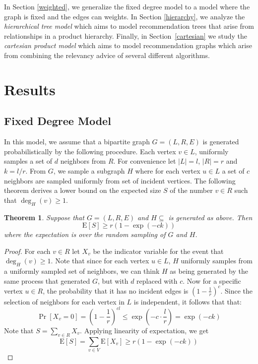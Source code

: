\documentclass[]{article}
\newcommand{\E}{\text{E}}
\newtheorem{thm}{Theorem}
\begin{document}
In Section \ref{weighted}, we generalize the fixed degree model to a
model where the graph is fixed and the edges can weights. In Section
\ref{hierarchy}, we analyze the {\em hierarchical tree model} which
aims to model recommendation trees that arise from relationships in a
product hierarchy. Finally, in Section~\ref{cartesian} we study the 
{\em cartesian product model} which aims to model recommendation 
graphs which arise from combining the relevancy advice of several 
different algorithms.

\section{Results}
\subsection{Fixed Degree Model}
\label{fixed-degree}

In this model, we assume that a bipartite graph $G=(L,R,E)$ is
generated probabilistically by the following procedure. Each
vertex $v\in L$, uniformly samples a set of $d$ neighbors
from $R$. For convenience let $|L|=l$, $|R|=r$ and $k=l/r$. From
$G$, we sample a subgraph $H$ where for each vertex $u\in L$ a set of
$c$ neighbors are sampled uniformly from set of incident vertices. The
following theorem derives a lower bound on the expected size $S$ of the
number $v\in R$ such that $\deg_H(v) \geq 1$.

\begin{thm}
Suppose that $G=(L,R,E)$ and $H\subseteq$ is generated as above. Then
\[ \E[S] \geq r(1-\exp(-ck))\]
where the expectation is over the random sampling of $G$ and $H$.
\end{thm}
\begin{proof}
For each $v\in R$ let $X_v$ be the indicator variable for the event
that $\deg_H(v) \geq 1$. Note that since for each vertex $u\in L$, $H$
uniformly samples from a uniformly sampled set of neighbors, we can
think $H$ as being generated by the same process that generated $G$,
but with $d$ replaced with $c$. Now for a specific vertex $u \in R$,
the probability that it has no incident edges is 
$\left(1-\frac{1}{r}\right)^c$. Since the selection of neighbors for each 
vertex in $L$ is independent, it follows that that:
\[ \Pr[X_v=0] = \left(1-\frac{1}{r}\right)^{cl} \leq \exp\left(-c \cdot \frac{l}{r}\right) = \exp(-ck) \]
Note that $S = \sum_{v\in R} X_v$. Applying linearity of expectation, we get
\[ \E[S] = \sum_{v\in V} \E[X_v] \geq r(1-\exp(-ck))\]
\end{proof}
\end{document}
